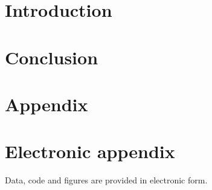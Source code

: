 \documentclass[12pt]{article}
\begin{document}
	\newpage
	\tableofcontents
	
	\newpage
	
	
	
	\section{Introduction}
	\label{intro}
	
	\newpage
	
	\section{Conclusion}
	\label{conclusion}
	
	
	\newpage
	
	
	
	\setcounter{page}{5} %
	
	\appendix
	
	\section{Appendix}
	\label{app}
	
	\newpage
	
	\section{Electronic appendix}
	\label{el_app}
	
	Data, code and figures are provided in electronic form.
	
	\newpage
	
	
	\RaggedRight
	
	
	\newpage
	
\end{document}
